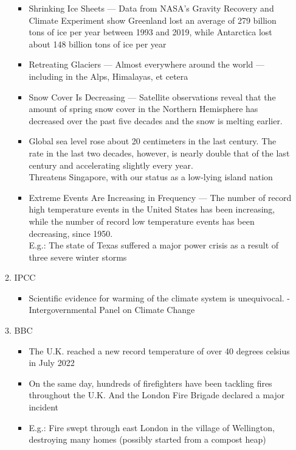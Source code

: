 \documentclass[oneside]{book}
\begin{document}
\begin{enumerate}
\begin{enumerate}
\begin{itemize}
            \item Shrinking Ice Sheets --- Data from NASA's Gravity Recovery and Climate Experiment show Greenland lost an average of 279 billion tons of ice per year between 1993 and 2019, while Antarctica lost about 148 billion tons of ice per year
            \item Retreating Glaciers --- Almost everywhere around the world — including in the Alps, Himalayas, et cetera
            \item Snow Cover Is Decreasing --- Satellite observations reveal that the amount of spring snow cover in the Northern Hemisphere has decreased over the past five decades and the snow is melting earlier.
            \item Global sea level rose about 20 centimeters in the last century. The rate in the last two decades, however, is nearly double that of the last century and accelerating slightly every year.\\[2mm]
            Threatens Singapore, with our status as a low-lying island nation
            \item Extreme Events Are Increasing in Frequency --- 
            The number of record high temperature events in the United States has been increasing, while the number of record low temperature events has been decreasing, since 1950.\\[2mm]
            E.g.: The state of Texas suffered a major power crisis as a result of three severe winter storms
        \end{itemize}
        \item IPCC 
        \begin{itemize}
            \item Scientific evidence for warming of the climate system is unequivocal. 
            \small    - Intergovernmental Panel on Climate Change \normalsize
        \end{itemize}
        \item BBC \begin{itemize}
            \item The U.K. reached a new record temperature of over 40 degrees celsius in July 2022
            \item On the same day, hundreds of firefighters have been tackling fires throughout the U.K. And the London Fire Brigade declared a major incident
            \item E.g.: Fire swept through east London in the village of Wellington, destroying many homes (possibly started from a compost heap)

\end{itemize}
\end{enumerate}
\end{enumerate}
\end{document}
